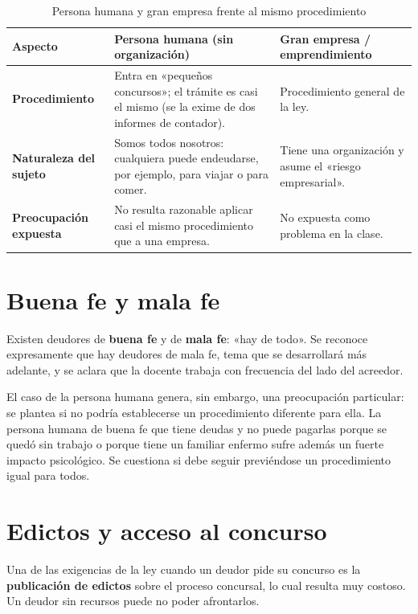 \documentclass[12pt,oneside]{book}
\begin{document}
\begin{table}[H]
\centering
\caption{Persona humana y gran empresa frente al mismo procedimiento}
\begin{tabularx}{\textwidth}{>{\raggedright\arraybackslash}p{}>{\raggedright\arraybackslash}X>{\raggedright\arraybackslash}X}
\toprule
\textbf{Aspecto} & \textbf{Persona humana (sin organización)} & \textbf{Gran empresa / emprendimiento} \\
\midrule
\textbf{Procedimiento} & Entra en «pequeños concursos»; el trámite es casi el mismo (se la exime de dos informes de contador). & Procedimiento general de la ley. \\
\textbf{Naturaleza del sujeto} & Somos todos nosotros: cualquiera puede endeudarse, por ejemplo, para viajar o para comer. & Tiene una organización y asume el «riesgo empresarial». \\
\textbf{Preocupación expuesta} & No resulta razonable aplicar casi el mismo procedimiento que a una empresa. & No expuesta como problema en la clase. \\
\bottomrule
\end{tabularx}
\end{table}

\section{Buena fe y mala fe}

Existen deudores de \textbf{buena fe} y de \textbf{mala fe}: «hay de todo». Se reconoce expresamente que hay deudores de mala fe, tema que se desarrollará más adelante, y se aclara que la docente trabaja con frecuencia del lado del acreedor.

El caso de la persona humana genera, sin embargo, una preocupación particular: se plantea si no podría establecerse un procedimiento diferente para ella. La persona humana de buena fe que tiene deudas y no puede pagarlas porque se quedó sin trabajo o porque tiene un familiar enfermo sufre además un fuerte impacto psicológico. Se cuestiona si debe seguir previéndose un procedimiento igual para todos.

\section{Edictos y acceso al concurso}

Una de las exigencias de la ley cuando un deudor pide su concurso es la \textbf{publicación de edictos} sobre el proceso concursal, lo cual resulta muy costoso. Un deudor sin recursos puede no poder afrontarlos.
\end{document}
